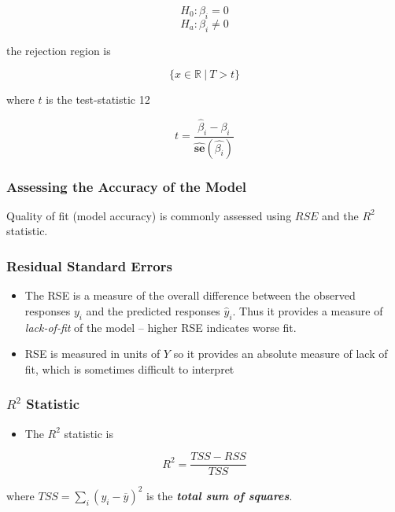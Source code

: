 \documentclass[11pt]{article}
\providecommand{\tightlist}{%
      \setlength{\itemsep}{0pt}\setlength{\parskip}{0pt}}
\begin{document}
\[H_0: \beta_i = 0\] \[H_a: \beta_i \neq 0\]

the rejection region is

\[\{ x\in \mathbb{R}\ |\ T > t \}\]

where \(t\) is the test-statistic 12

\[ t = \frac{\hat{\beta}_i - \beta_i}{\hat{\mathbf{se}}(\hat{\beta_i})} \]

    \hypertarget{assessing-the-accuracy-of-the-model}{%
\subsubsection{Assessing the Accuracy of the
Model}\label{assessing-the-accuracy-of-the-model}}

    Quality of fit (model accuracy) is commonly assessed using \(RSE\) and
the \(R^2\) statistic.

    \hypertarget{residual-standard-errors}{%
\subsubsection{Residual Standard
Errors}\label{residual-standard-errors}}

    \begin{itemize}
\item
  The RSE is a measure of the overall difference between the observed
  responses \(y_i\) and the predicted responses \(\hat{y}_i\). Thus it
  provides a measure of \emph{lack-of-fit} of the model -- higher RSE
  indicates worse fit.
\item
  RSE is measured in units of \(Y\) so it provides an absolute measure
  of lack of fit, which is sometimes difficult to interpret
\end{itemize}

    \hypertarget{r2-statistic}{%
\subsubsection{\texorpdfstring{\(R^2\)
Statistic}{R\^{}2 Statistic}}\label{r2-statistic}}

    \begin{itemize}
\tightlist
\item
  The \(R^2\) statistic is
\end{itemize}

\[ R^2 = \frac{TSS - RSS}{TSS}\]

where \(TSS = \sum_i (y_i - \overline{y})^2\) is the \textbf{\emph{total
sum of squares}}.
\end{document}
